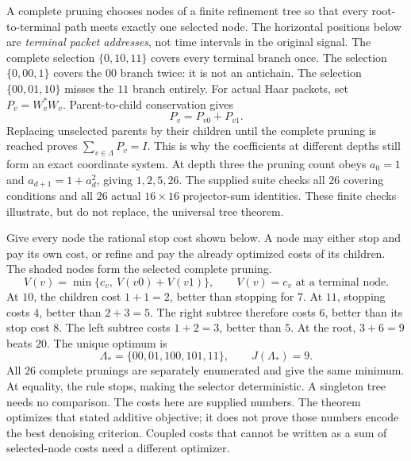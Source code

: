 A complete pruning chooses nodes of a finite refinement tree so that every root-to-terminal path meets exactly one selected node. The horizontal positions below are \emph{terminal packet addresses}, not time intervals in the original signal.
The complete selection $\{0,10,11\}$ covers every terminal branch once. The selection $\{0,00,1\}$ covers the $00$ branch twice: it is not an antichain. The selection $\{00,01,10\}$ misses the $11$ branch entirely.
For actual Haar packets, set $P_v=W_v^*W_v$. Parent-to-child conservation gives
\[
P_v=P_{v0}+P_{v1}.
\]
Replacing unselected parents by their children until the complete pruning is reached proves $\sum_{v\in\Lambda}P_v=I$. This is why the coefficients at different depths still form an exact coordinate system.
At depth three the pruning count obeys $a_0=1$ and $a_{d+1}=1+a_d^2$, giving $1,2,5,26$. The supplied suite checks all $26$ covering conditions and all $26$ actual $16\times16$ projector-sum identities. These finite checks illustrate, but do not replace, the universal tree theorem.

Give every node the rational stop cost shown below. A node may either stop and pay its own cost, or refine and pay the already optimized costs of its children. The shaded nodes form the selected complete pruning.
\[
V(v)=\min\{c_v,\ V(v0)+V(v1)\},
\qquad V(v)=c_v\text{ at a terminal node}.
\]
At $10$, the children cost $1+1=2$, better than stopping for $7$. At $11$, stopping costs $4$, better than $2+3=5$. The right subtree therefore costs $6$, better than its stop cost $8$. The left subtree costs $1+2=3$, better than $5$. At the root, $3+6=9$ beats $20$.
The unique optimum is
\[
\Lambda_* = \{00,01,100,101,11\},\qquad J(\Lambda_*)=9.
\]
All $26$ complete prunings are separately enumerated and give the same minimum. At equality, the rule stops, making the selector deterministic. A singleton tree needs no comparison.
The costs here are supplied numbers. The theorem optimizes that stated additive objective; it does not prove those numbers encode the best denoising criterion. Coupled costs that cannot be written as a sum of selected-node costs need a different optimizer.

